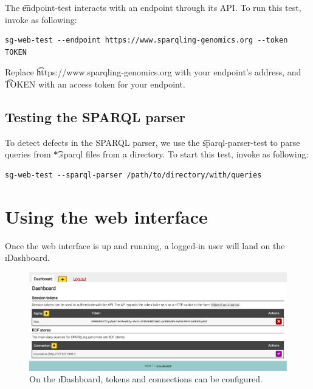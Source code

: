  The \t{endpoint-test} interacts with an endpoint through its API.  To run
  this test, invoke  as following:

\begin{lstlisting}
sg-web-test --endpoint https://www.sparqling-genomics.org --token TOKEN
\end{lstlisting}

  Replace \t{https://www.sparqling-genomics.org} with your endpoint's
  address, and \t{TOKEN} with an access token for your endpoint.

\subsection{Testing the SPARQL parser}

  To detect defects in the SPARQL parser, we use the \t{sparql-parser-test}
  to parse queries from \t{*.sparql} files from a directory.  To start this
  test, invoke  as following:

\begin{lstlisting}
sg-web-test --sparql-parser /path/to/directory/with/queries
\end{lstlisting}

\pagebreak{}
\section{Using the web interface}
\label{sec:using-web-interface}

  Once the web interface is up and running, a logged-in user will land
  on the \i{Dashboard}.

  \begin{figure}[H]
    \begin{center}
      \includegraphics[width=1.0\textwidth]{figures/sg-web-dashboard.pdf}
    \end{center}
    \caption{On the \i{Dashboard}, tokens and connections can be
      configured.}
    \label{fig:web-dashboard}
  \end{figure}

